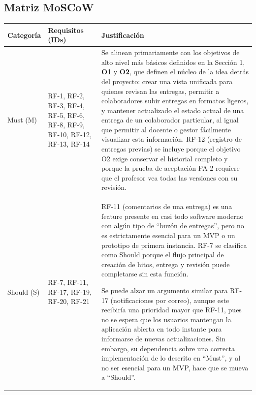 \documentclass[10pt,a4paper]{article}
\newcommand{\hrow}{\rowcolor{encabezado}}
\newcommand{\h}[1]{\textbf{#1}}
\begin{document}
\subsection{Matriz MoSCoW}
\begin{xltabular}{\linewidth}{|P{2.6cm}|L|P{6.0cm}|}
\hline\hrow \h{Categoría} & \h{Requisitos (IDs)} & \h{Justificación} \\ \hline
\endhead
Must (M) & RF-1, RF-2, RF-3, RF-4, RF-5, RF-6, RF-8, RF-9, RF-10, RF-12, RF-13, RF-14 & Se alinean primariamente con los objetivos de alto nivel más básicos definidos en la Sección 1, \textbf{O1} y \textbf{O2}, que definen el núcleo de la idea detrás del proyecto: crear una vista unificada para quienes revisan las entregas, permitir a colaboradores subir entregas en formatos ligeros, y mantener actualizado el estado actual de una entrega de un colaborador particular, al igual que permitir al docente o gestor fácilmente visualizar esta información. RF-12 (registro de entregas previas) se incluye porque el objetivo O2 exige conservar el historial completo y porque la prueba de aceptación PA-2 requiere que el profesor vea todas las versiones con su revisión. \\ \hline
Should (S) & RF-7, RF-11, RF-17, RF-19, RF-20, RF-21 & RF-11 (comentarios de una entrega) es una feature presente en casi todo software moderno con algún tipo de ``buzón de entregas'', pero no es estrictamente esencial para un MVP o un prototipo de primera instancia. RF-7 se clasifica como Should porque el flujo principal de creación de hitos, entrega y revisión puede completarse sin esta función.

Se puede alzar un argumento similar para RF-17 (notificaciones por correo), aunque este recibiría una prioridad mayor que RF-11, pues no se espera que los usuarios mantengan la aplicación abierta en todo instante para informarse de nuevas actualizaciones. Sin embargo, su dependencia sobre una correcta implementación de lo descrito en ``Must'', y al no ser esencial para un MVP, hace que se mueva a ``Should''.


\end{xltabular}
\end{document}
